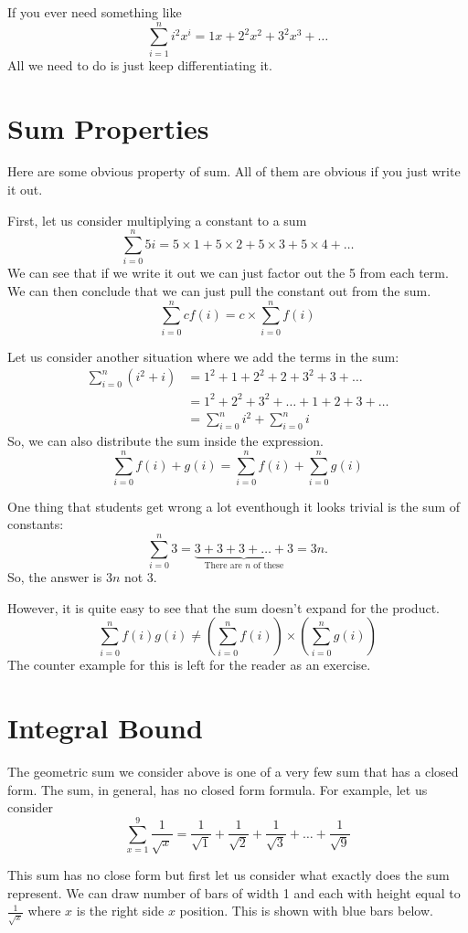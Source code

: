 \documentclass[a4paper, 12pt]{article}
\newcommand{\sumn}{\sum^n_{i=0}}
\begin{document}
If you ever need something like
\[
	\sum^{n}_{i=1} i^2x^i = 1x + 2^2x^2 + 3^2x^3 + \ldots
\]
All we need to do is just keep differentiating it. 
\begin{multicols}{2}
\section*{Sum Properties}
Here are some obvious property of sum. All of them are obvious if you just write it out.

First, let us consider multiplying a constant to a sum
\[
    \sum_{i=0}^n 5 i  = 5\times 1 + 5\times 2 + 5\times 3 + 5\times 4 + \ldots
\]
We can see that if we write it out we can just factor out the 5 from each term. We can then conclude that we can just pull the constant out from the sum.
\[
    \sum_{i=0}^n c f(i) = c \times  \sum_{i=0}^n f(i)
\]

Let us consider another situation where we add the terms in the sum:
\begin{align*}
    \sumn \left(i^2 + i\right) &= 1^2 + 1 + 2^2 + 2 + 3^2 + 3 + \ldots\\
    &= 1^2 + 2^2 + 3^2 + \ldots + 1 + 2 + 3 + \ldots\\
    &= \sumn i^2 + \sumn i
\end{align*}
So, we can also distribute the sum inside the expression.
\[
    \sumn f(i) + g(i) = \sumn f(i) + \sumn g(i)
\]

One thing that students get wrong a lot eventhough it looks trivial is the sum of constants:
\[
	\sum_{i=0}^n 3 = \underbrace{3 + 3 + 3 + \ldots + 3}_{\text{There are $n$ of these}} = 3n.
\]
So, the answer is $3n$ not 3.

However, it is quite easy to see that the sum doesn't expand for the product.
\[
    \sumn f(i)g(i) \ne \left(\sumn f(i)\right) \times \left(\sumn g(i)\right)
\]
The counter example for this is left for the reader as an exercise.

\section*{Integral Bound}
The geometric sum we consider above is one of a very few sum that has a closed form. The sum, in general, has no closed form formula. For example, let us consider
\[
    \sum_{x=1}^{9} \frac{1}{\sqrt{x}} = \frac{1}{\sqrt{1}} + \frac{1}{\sqrt{2}} + \frac{1}{\sqrt{3}}+ \ldots+ \frac{1}{\sqrt{9}} 
\]

This sum has no close form but first let us consider what exactly does the sum represent. We can draw number of bars of width 1 and each with height equal to $\frac{1}{\sqrt{x}}$ where $x$ is the right side $x$ position. This is shown with blue bars below.


\end{multicols}
\end{document}
